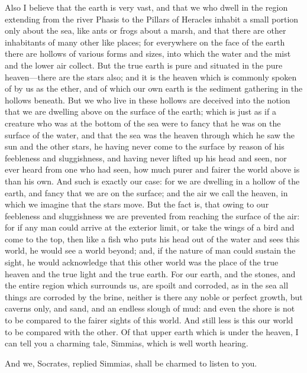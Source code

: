 Also I believe that the earth is very vast, and that we who dwell in the
region extending from the river Phasis to the Pillars of Heracles inhabit
a small portion only about the sea, like ants or frogs about a marsh, and
that there are other inhabitants of many other like places; for everywhere
on the face of the earth there are hollows of various forms and sizes,
into which the water and the mist and the lower air collect. But the true
earth is pure and situated in the pure heaven—there are the stars
also; and it is the heaven which is commonly spoken of by us as the ether,
and of which our own earth is the sediment gathering in the hollows
beneath. But we who live in these hollows are deceived into the notion
that we are dwelling above on the surface of the earth; which is just as
if a creature who was at the bottom of the sea were to fancy that he was
on the surface of the water, and that the sea was the heaven through which
he saw the sun and the other stars, he having never come to the surface by
reason of his feebleness and sluggishness, and having never lifted up his
head and seen, nor ever heard from one who had seen, how much purer and
fairer the world above is than his own. And such is exactly our case: for
we are dwelling in a hollow of the earth, and fancy that we are on the
surface; and the air we call the heaven, in which we imagine that the
stars move. But the fact is, that owing to our feebleness and sluggishness
we are prevented from reaching the surface of the air: for if any man
could arrive at the exterior limit, or take the wings of a bird and come
to the top, then like a fish who puts his head out of the water and sees
this world, he would see a world beyond; and, if the nature of man could
sustain the sight, he would acknowledge that this other world was the
place of the true heaven and the true light and the true earth. For our
earth, and the stones, and the entire region which surrounds us, are
spoilt and corroded, as in the sea all things are corroded by the brine,
neither is there any noble or perfect growth, but caverns only, and sand,
and an endless slough of mud: and even the shore is not to be compared to
the fairer sights of this world. And still less is this our world to be
compared with the other. Of that upper earth which is under the heaven, I
can tell you a charming tale, Simmias, which is well worth hearing.

And we, Socrates, replied Simmias, shall be charmed to listen to you.

